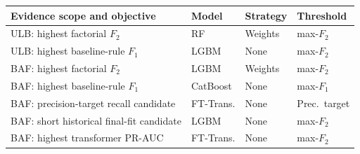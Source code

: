 \begin{tabularx}{\linewidth}{@{}X l l l@{}}
\toprule
Evidence scope and objective & Model & Strategy & Threshold \\
\midrule
ULB: highest factorial $F_2$ & RF & Weights & max-$F_2$ \\
ULB: highest baseline-rule $F_1$ & LGBM & None & max-$F_2$ \\
BAF: highest factorial $F_2$ & LGBM & Weights & max-$F_2$ \\
BAF: highest baseline-rule $F_1$ & CatBoost & None & max-$F_1$ \\
BAF: precision-target recall candidate & FT-Trans. & None & Prec.\ target \\
BAF: short historical final-fit candidate & LGBM & None & max-$F_2$ \\
BAF: highest transformer PR-AUC & FT-Trans. & None & max-$F_2$ \\
\bottomrule
\end{tabularx}

